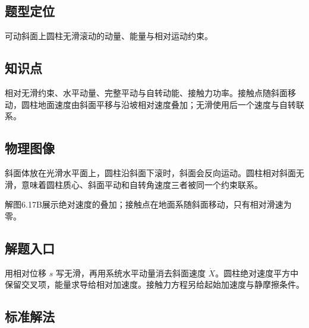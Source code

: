 \documentclass[UTF8,fontset=fandol,a4paper,11pt]{ctexart}
\begin{document}


\subsection*{题型定位}

可动斜面上圆柱无滑滚动的动量、能量与相对运动约束。



\subsection*{知识点}

相对无滑约束、水平动量、完整平动与自转动能、接触力功率。接触点随斜面移动，圆柱地面速度由斜面平移与沿坡相对速度叠加；无滑使用后一个速度与自转联系。




\subsection*{物理图像}

斜面体放在光滑水平面上，圆柱沿斜面下滚时，斜面会反向运动。圆柱相对斜面无滑，意味着圆柱质心、斜面平动和自转角速度三者被同一个约束联系。

解图6.17B展示绝对速度的叠加；接触点在地面系随斜面移动，只有相对滑速为零。



\subsection*{解题入口}

用相对位移 $s$ 写无滑，再用系统水平动量消去斜面速度 $\dot X$。圆柱绝对速度平方中保留交叉项，能量求导给相对加速度。接触力方程另给起始加速度与静摩擦条件。



\subsection*{标准解法}
\end{document}
